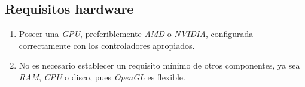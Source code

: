 \subsection{Requisitos hardware} \label{sub:hardware-requirement}

\begin{enumerate}
    \item Poseer una \textit{GPU}, preferiblemente \textit{AMD} o \textit{NVIDIA}, configurada correctamente con los controladores apropiados.

    \item No es necesario establecer un requisito mínimo de otros componentes, ya sea \textit{RAM}, \textit{CPU} o disco, pues \textit{OpenGL} es flexible.
\end{enumerate}

